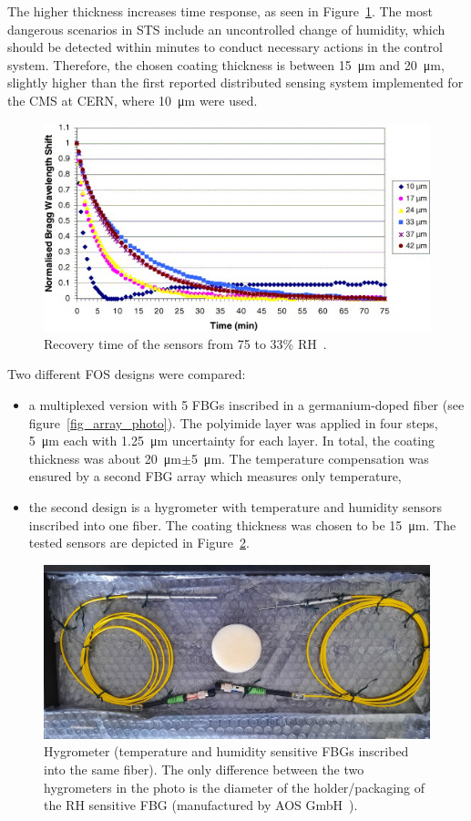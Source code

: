 The higher thickness increases time response, as seen in Figure~\ref{fig:yeo2}. The most dangerous scenarios in \gls{STS} include an uncontrolled change of humidity, which should be detected within minutes to conduct necessary actions in the control system. Therefore, the chosen coating thickness is between \SI{15}{\micro\metre} and \SI{20}{\micro\metre}, slightly higher than the first reported distributed sensing system implemented for the \gls{CMS} at \gls{CERN}, where \SI{10}{\micro\metre} were used. 
\begin{figure}[!h]
\centering
\includegraphics[width=0.80\columnwidth]{Chapter5/images/time_response_yeo.jpg}
\caption{Recovery time of the sensors from 75 to 33\% RH~\cite{YEO_PI}.}
\label{fig:yeo2}
\end{figure}
\newpage
Two different \gls{FOS} designs were compared:
\begin{itemize}
    \item a multiplexed version with 5 \glspl{FBG} inscribed in a germanium-doped fiber (see figure~\ref{fig_array_photo}). The polyimide layer was applied in four steps, \SI{5}{\micro\metre} each with \SI{1.25}{\micro\metre} uncertainty for each layer. In total, the coating thickness was about \SI{20}{\micro\metre}$\pm$\SI{5}{\micro\metre}. The temperature compensation was ensured by a second \gls{FBG} array which measures only temperature,
    \item the second design is a hygrometer with temperature and humidity sensors inscribed into one fiber. The coating thickness was chosen to be \SI{15}{\micro\metre}. The tested sensors are depicted in Figure~\ref{fig_single_photo}.
\end{itemize}

\begin{figure}[!h]
\centering
\includegraphics[width=0.7\columnwidth]{Chapter5/images/single1.jpeg}
\caption{Hygrometer (temperature and humidity sensitive \glspl{FBG} inscribed into the same fiber). The only difference between the two hygrometers in the photo is the diameter of the holder/packaging of the \gls{RH} sensitive \gls{FBG} (manufactured by AOS GmbH~\cite{AOS}).}
\label{fig_single_photo}
\end{figure}


